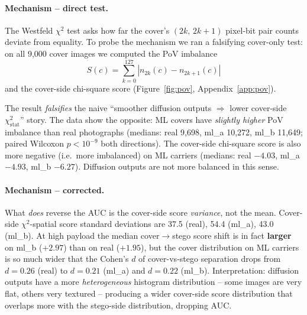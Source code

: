 \documentclass[10pt,twocolumn,a4paper]{article}
\begin{document}
\paragraph{Mechanism -- direct test.} The Westfeld $\chi^2$ test asks how far the cover's $(2k,\,2k\!+\!1)$ pixel-bit pair counts deviate from equality. To probe the mechanism we ran a falsifying cover-only test: on all 9{,}000 cover images we computed the PoV imbalance
\begin{equation}
S(c) = \sum_{k=0}^{127} |n_{2k}(c) - n_{2k+1}(c)|
\label{eq:pov-imbalance}
\end{equation}
\noindent and the cover-side chi-square score (Figure~\ref{fig:pov}, Appendix~\ref{app:pov}).

The result \emph{falsifies} the naive ``smoother diffusion outputs $\Rightarrow$ lower cover-side $\chi^2_\text{stat}$'' story. The data show the opposite: ML covers have \emph{slightly higher} PoV imbalance than real photographs (medians: real 9{,}698, ml\_a 10{,}272, ml\_b 11{,}649; paired Wilcoxon $p\!<\!10^{-9}$ both directions). The cover-side chi-square score is also more negative (i.e.\ more imbalanced) on ML carriers (medians: real $-4.03$, ml\_a $-4.93$, ml\_b $-6.27$). Diffusion outputs are not more balanced in this sense.

\paragraph{Mechanism -- corrected.} What \emph{does} reverse the AUC is the cover-side score \emph{variance}, not the mean. Cover-side $\chi^2$-spatial score standard deviations are 37.5 (real), 54.4 (ml\_a), 43.0 (ml\_b). At high payload the median cover$\to$stego score shift is in fact \textbf{larger} on ml\_b ($+2.97$) than on real ($+1.95$), but the cover distribution on ML carriers is so much wider that the Cohen's $d$ of cover-vs-stego separation drops from $d\!=\!0.26$ (real) to $d\!=\!0.21$ (ml\_a) and $d\!=\!0.22$ (ml\_b). Interpretation: diffusion outputs have a more \emph{heterogeneous} histogram distribution -- some images are very flat, others very textured -- producing a wider cover-side score distribution that overlaps more with the stego-side distribution, dropping AUC.
\end{document}
